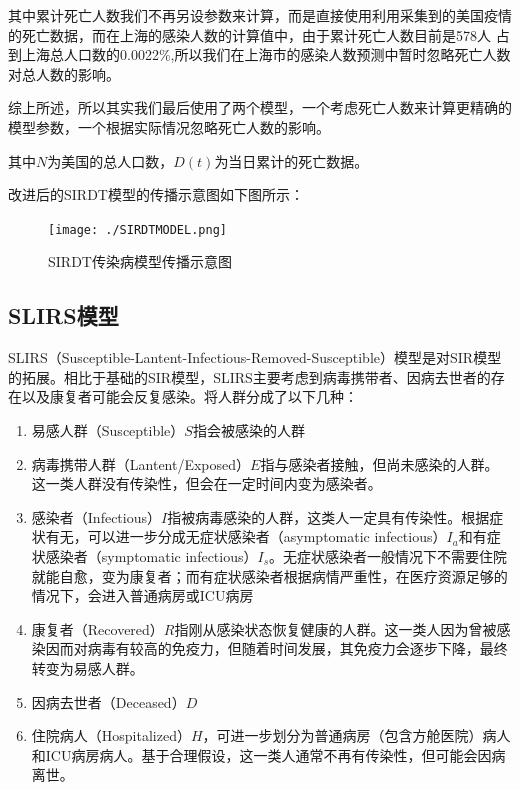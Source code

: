 \documentclass[bwprint]{gmcmthesis}
\numberwithin{figure}{section}
\begin{document}
\par 其中累计死亡人数我们不再另设参数来计算，而是直接使用利用采集到的美国疫情的死亡数据，而在上海的感染人数的计算值中，由于累计死亡人数目前是578人
占到上海总人口数的0.0022$\%$,所以我们在上海市的感染人数预测中暂时忽略死亡人数对总人数的影响。

\par 综上所述，所以其实我们最后使用了两个模型，一个考虑死亡人数来计算更精确的模型参数，一个根据实际情况忽略死亡人数的影响。

\par 其中$N$为美国的总人口数，$D\left( t \right)$为当日累计的死亡数据。

\par 改进后的SIRDT模型的传播示意图如下图所示：

\begin{figure}[!h]
    \centering
    \texttt{[image: ./SIRDTMODEL.png]}
    \caption{SIRDT传染病模型传播示意图}
    \label{fig1}
\end{figure}


\subsection{SLIRS模型}
SLIRS（Susceptible-Lantent-Infectious-Removed-Susceptible）模型是对SIR模型的拓展。相比于基础的SIR模型，SLIRS主要考虑到病毒携带者、因病去世者的存在以及康复者可能会反复感染。将人群分成了以下几种：
\begin{enumerate}
\item 易感人群（Susceptible）$S$指会被感染的人群
\item 病毒携带人群（Lantent/Exposed）$E$指与感染者接触，但尚未感染的人群。这一类人群没有传染性，但会在一定时间内变为感染者。
\item 感染者（Infectious）$I$指被病毒感染的人群，这类人一定具有传染性。根据症状有无，可以进一步分成无症状感染者（asymptomatic infectious）$I_a$和有症状感染者（symptomatic infectious）$I_s$。无症状感染者一般情况下不需要住院就能自愈，变为康复者；而有症状感染者根据病情严重性，在医疗资源足够的情况下，会进入普通病房或ICU病房
\item 康复者（Recovered）$R$指刚从感染状态恢复健康的人群。这一类人因为曾被感染因而对病毒有较高的免疫力，但随着时间发展，其免疫力会逐步下降，最终转变为易感人群。
\item 因病去世者（Deceased）$D$
\item 住院病人（Hospitalized）$H$，可进一步划分为普通病房（包含方舱医院）病人和ICU病房病人。基于合理假设，这一类人通常不再有传染性，但可能会因病离世。


\end{enumerate}
\end{document}
